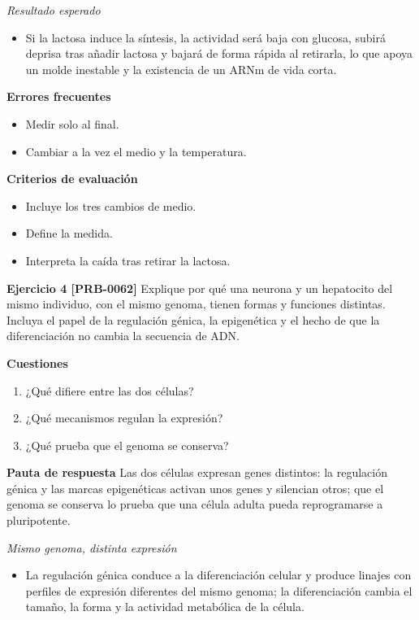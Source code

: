 \documentclass{book}
\begin{document}
\noindent\textit{Resultado esperado}
\begin{itemize}
\item Si la lactosa induce la síntesis, la actividad será baja con glucosa, subirá deprisa tras añadir lactosa y bajará de forma rápida al retirarla, lo que apoya un molde inestable y la existencia de un ARNm de vida corta.
\end{itemize}

\noindent\textbf{Errores frecuentes}
\begin{itemize}
\item Medir solo al final.
\item Cambiar a la vez el medio y la temperatura.
\end{itemize}

\noindent\textbf{Criterios de evaluación}
\begin{itemize}
\item Incluye los tres cambios de medio.
\item Define la medida.
\item Interpreta la caída tras retirar la lactosa.
\end{itemize}

\noindent\textbf{Ejercicio 4 [PRB-0062]}
Explique por qué una neurona y un hepatocito del mismo individuo, con el mismo genoma, tienen formas y funciones distintas. Incluya el papel de la regulación génica, la epigenética y el hecho de que la diferenciación no cambia la secuencia de ADN.


\noindent\textbf{Cuestiones}
\begin{enumerate}
\item ¿Qué difiere entre las dos células?
\item ¿Qué mecanismos regulan la expresión?
\item ¿Qué prueba que el genoma se conserva?
\end{enumerate}

\noindent\textbf{Pauta de respuesta}
Las dos células expresan genes distintos: la regulación génica y las marcas epigenéticas activan unos genes y silencian otros; que el genoma se conserva lo prueba que una célula adulta pueda reprogramarse a pluripotente.


\noindent\textit{Mismo genoma, distinta expresión}
\begin{itemize}
\item La regulación génica conduce a la diferenciación celular y produce linajes con perfiles de expresión diferentes del mismo genoma; la diferenciación cambia el tamaño, la forma y la actividad metabólica de la célula.
\end{itemize}
\end{document}
